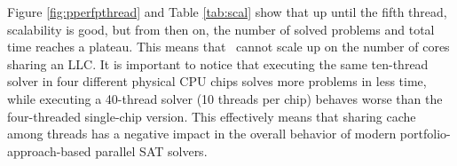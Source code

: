 Figure \ref{fig:pperfpthread} and Table \ref{tab:scal} show that up
until the fifth thread, scalability is good, but from then on, the
number of solved problems and total time reaches a plateau. This means
that \pling\ cannot scale up on the number of cores sharing an LLC. It
is important to notice that executing the same ten-thread solver in
four different physical CPU chips solves more problems in less time,
while executing a 40-thread solver (10 threads per chip) behaves worse
than the four-threaded single-chip version. This effectively means
that sharing cache among threads has a negative impact in the overall
behavior of modern portfolio-approach-based parallel SAT solvers.



